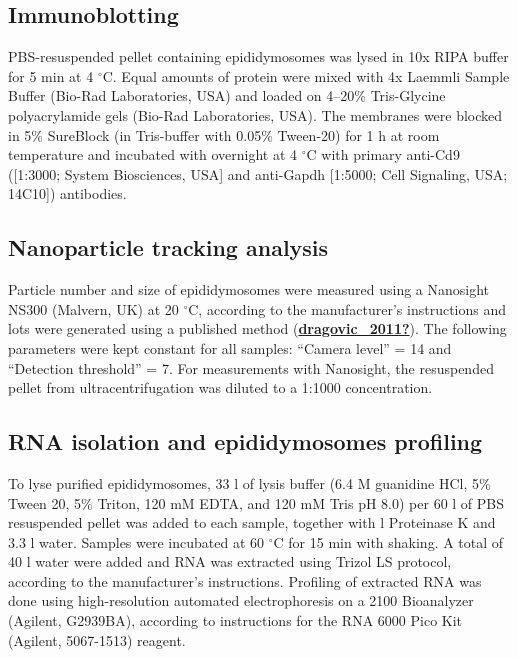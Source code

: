 \documentclass[12pt,twoside]{reedthesis}
\begin{document}
\hypertarget{immunoblotting}{%
\subsection{Immunoblotting}\label{immunoblotting}}

PBS-resuspended pellet containing epididymosomes was lysed in 10x RIPA
buffer for 5 min at 4 \(^{\circ}\)C. Equal amounts of protein were mixed
with 4x Laemmli Sample Buffer (Bio-Rad Laboratories, USA) and loaded on
4--20\% Tris-Glycine polyacrylamide gels (Bio-Rad Laboratories, USA). The
membranes were blocked in 5\% SureBlock (in Tris-buffer with 0.05\%
Tween-20) for 1 h at room temperature and incubated with overnight at 4
\(^{\circ}\)C with primary anti-Cd9 ({[}1:3000; System Biosciences, USA{]} and
anti-Gapdh {[}1:5000; Cell Signaling, USA; 14C10{]}) antibodies.

\hypertarget{nanoparticle-tracking-analysis}{%
\subsection{Nanoparticle tracking analysis}\label{nanoparticle-tracking-analysis}}

Particle number and size of epididymosomes were measured using a
Nanosight NS300 (Malvern, UK) at 20 \(^{\circ}\)C, according to the
manufacturer's instructions and lots were generated using a published
method (\protect\hyperlink{ref-dragovic_2011}{\textbf{dragovic\_2011?}}). The following parameters were kept constant for
all samples: ``Camera level'' = 14 and ``Detection threshold'' = 7. For
measurements with Nanosight, the resuspended pellet from
ultracentrifugation was diluted to a 1:1000 concentration.

\hypertarget{rna-isolation-and-epididymosomes-profiling}{%
\subsection{RNA isolation and epididymosomes profiling}\label{rna-isolation-and-epididymosomes-profiling}}

To lyse purified epididymosomes, 33 \textmu l of lysis buffer (6.4 M
guanidine HCl, 5\% Tween 20, 5\% Triton, 120 mM EDTA, and 120 mM Tris pH
8.0) per 60 \textmu l of PBS resuspended pellet was added to each
sample, together with \textmu l Proteinase K and 3.3 \textmu l water.
Samples were incubated at 60 \(^{\circ}\)C for 15 min with shaking. A
total of 40 \textmu l water were added and RNA was extracted using
Trizol LS protocol, according to the manufacturer's instructions.
Profiling of extracted RNA was done using high-resolution automated
electrophoresis on a 2100 Bioanalyzer (Agilent, G2939BA), according to
instructions for the RNA 6000 Pico Kit (Agilent, 5067-1513) reagent.
\end{document}
